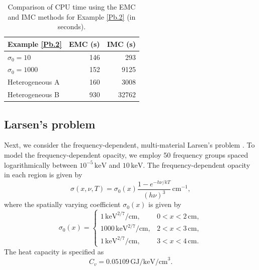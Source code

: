 \documentclass[preprint,12pt]{elsarticle}
\theoremstyle{definition}
\theoremstyle{plain}
\numberwithin{equation}{section}
\numberwithin{algorithm}{section}
\newcounter{eq_count}
\newcounter{thm_count}
\newcounter{tab_count}
\begin{document}
\begin{table}[!htb]
	\centering
	\begin{tabular}{lrr}
		\toprule
		\textbf{Example \ref{Pb.2}} & \textbf{EMC (s)} & \textbf{IMC (s)} \\
		\midrule
		$\sigma_0 = 10$        & 146   & 293    \\
		$\sigma_0 = 1000$      & 152   & 9125   \\
		Heterogeneous A        & 160   & 3008   \\
		Heterogeneous B        & 930   & 32762  \\
		\bottomrule
	\end{tabular}
	\caption{Comparison of CPU time using the EMC and IMC methods for Example \ref{Pb.2} (in seconds).}
	\label{tabel_Pb2}
\end{table}

    \subsection{Larsen’s problem }\label{Pb.3}
  Next, we consider the frequency-dependent, multi-material Larsen’s problem \cite{larsen1988grey, sun2015asymptoticA, shi2023maximum}. To model the frequency-dependent opacity, we employ 50 frequency groups spaced logarithmically between $10^{-5} \,\text{keV} $ and $10 \,\text{keV} $. The frequency-dependent opacity in each region is given by  
\begin{equation*}
    \sigma(x,\nu, T) = \sigma_0(x) \frac{1 - e^{-h \nu / k T}}{(h \nu)^3}\,\text{cm}^{-1},
\end{equation*}  
where   the spatially varying coefficient $\sigma_0(x)$ is given by
\begin{equation*}
    \sigma_0(x) = \begin{cases} 
        1 \,\text{keV}^{2/7} / \text{cm}, & 0 < x < 2 \,\text{cm}, \\  
        1000 \,\text{keV}^{2/7} / \text{cm}, & 2 < x < 3 \,\text{cm}, \\  
        1 \,\text{keV}^{2/7} / \text{cm}, & 3 < x < 4 \,\text{cm}.
    \end{cases}
\end{equation*}  
The heat capacity is specified as
\begin{equation*}
    C_v = 0.05109 \,\text{GJ/keV/cm}^3.
\end{equation*}  
\end{document}
